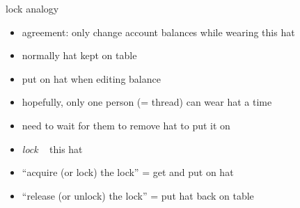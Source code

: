 \begin{frame}{lock analogy}
    \begin{itemize}
    \item agreement: only change account balances while wearing this hat
    \item normally hat kept on table
    \item put on hat when editing balance
    \vspace{.5cm}
    \item hopefully, only one person (= thread) can wear hat a time
    \item need to wait for them to remove hat to put it on
        \vspace{.5cm}
    \item<2-> \textit{lock} ~ this hat
    \item<2-> ``acquire (or lock) the lock'' = get and put on hat
    \item<2-> ``release (or unlock) the lock'' = put hat back on table
    \end{itemize}
\end{frame}
